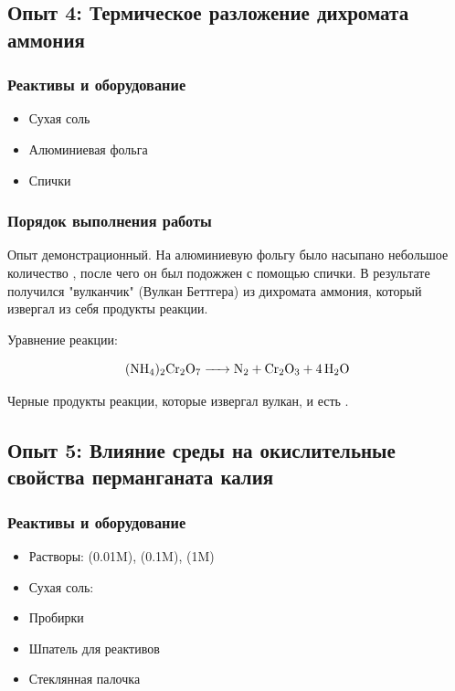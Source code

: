 \documentclass[a4paper, 12pt]{article}
\begin{document}

\subsection{Опыт 4: Термическое разложение дихромата аммония}

\subsubsection{Реактивы и оборудование}

\begin{itemize}
	\item Сухая соль 
	
	\item Алюминиевая фольга
	
	\item Спички
\end{itemize}	

\subsubsection{Порядок выполнения работы}

Опыт демонстрационный. На алюминиевую фольгу было насыпано небольшое количество , после чего он был подожжен с помощью спички. В результате получился "вулканчик" (Вулкан Беттгера) из дихромата аммония, который извергал из себя продукты реакции.

Уравнение реакции:

\begin{equation}
	\ce{(NH4)2Cr2O7 -> N2 + Cr2O3 + 4H2O}
\end{equation}

Черные продукты реакции, которые извергал вулкан, и есть .

\subsection{Опыт 5: Влияние среды на окислительные свойства перманганата калия}

\subsubsection{Реактивы и оборудование}

\begin{itemize}
	\item Растворы:  (0.01M),  (0.1M),  (1M)
	
	\item Сухая соль: 
	
	\item Пробирки
	\item Шпатель для реактивов
	\item Стеклянная палочка
\end{itemize}
\end{document}
